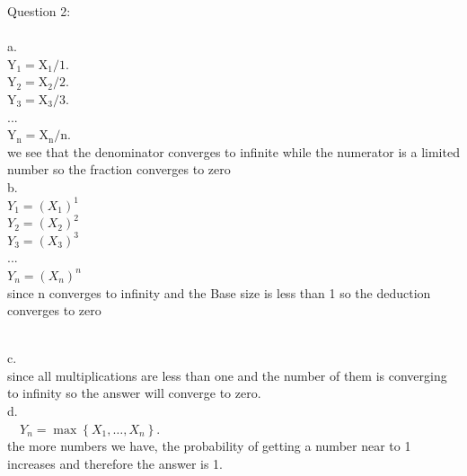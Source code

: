 \documentclass{article}
\begin{document}
	

Question 2: \\
\\

a. 
\\
$\mathrm{Y}_{\mathrm{1}}=\mathrm{X}_{\mathrm{1}} / \mathrm{1}$.\\
$\mathrm{Y}_{\mathrm{2}}=\mathrm{X}_{\mathrm{2}} / \mathrm{2}$.\\
$\mathrm{Y}_{\mathrm{3}}=\mathrm{X}_{\mathrm{3}} / \mathrm{3}$.\\
...\\
$\mathrm{Y}_{\mathrm{n}}=\mathrm{X}_{\mathrm{n}} / \mathrm{n}$.\\
we see that the denominator converges to infinite while the numerator is a limited number so the fraction converges to zero
\\

b.\\ $Y_{1}=\left(X_{1}\right)^{1}$\\
 $Y_{2}=\left(X_{2}\right)^{2}$\\
 $Y_{3}=\left(X_{3}\right)^{3}$\\
 ...\\
  $Y_{n}=\left(X_{n}\right)^{n}$\\
since n converges to infinity and the Base size is less than 1 so the deduction converges to zero

\\
c. \\
since all multiplications are less than one and the number of them is converging to infinity so the answer will converge to zero.
\\
d.\\ $\quad Y_{n}=\max \left\{X_{1}, \ldots, X_{n}\right\}$.\\
the more numbers we have, the probability of getting a number near to 1 increases and therefore the answer is 1.
\\
\end{document}

